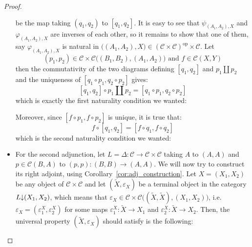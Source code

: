 \begin{proof}
\begin{itemize}
be the map taking $(q_1,q_2)$ to $[q_1,q_2]$. It is easy to see that $\psi_{(A_1,A_2),X}$ and $\varphi_{(A_1,A_2),X}$ are inverses of each other, so it remains to show that one of them, say $\varphi_{(A_1,A_2),X}$ is natural in $\big((A_1,A_2),X\big)\in(\mathcal{C}\times\mathcal{C})^{\mathrm{op}}\times\mathcal{C}$. Let
\[(p_1,p_2)\in\mathcal{C}\times\mathcal{C}\big((B_1,B_2),(A_1,A_2)\big)\text{ and }f\in\mathcal{C}(X,Y)\]
then the commutativity of the two diagrams defining $[q_1,q_2]$ and $p_1\amalg p_2$ and the uniqueness of $[q_1\circ p_1,q_2\circ p_2]$ gives:
\[[q_1,q_2]\circ p_1\amalg p_2=[q_1\circ p_1,q_2\circ p_2]\]
which is exactly the first naturality condition we wanted:
\begin{center}
\end{center}
Moreover, since $[f\circ p_1,f\circ p_2]$ is unique, it is true that:
\[f\circ[q_1,q_2]=[f\circ q_1,f\circ q_2]\]
which is the second naturality condition we wanted:
\begin{center}
\end{center}
\item For the second adjunction, let $L=\Delta:\mathcal{C}\to\mathcal{C}\times\mathcal{C}$ taking $A$ to $(A,A)$ and $p\in\mathcal{C}(B,A)$ to $(p,p):(B,B)\to(A,A)$. We will now try to construct its right adjoint, using Corollary~\ref{cor:adj_construction}. Let $X=(X_1,X_2)$ be any object of $\mathcal{C}\times\mathcal{C}$ and let $(\tilde{X},\varepsilon_X)$ be a terminal object in the category $L\mkern-5mu\downarrow\mkern-5mu (X_1,X_2)$, which means that $\varepsilon_X\in\mathcal{C}\times\mathcal{C}\big((\tilde{X},\tilde{X}),(X_1,X_2)\big)$, i.e. $\varepsilon_X=(\varepsilon^X_1,\varepsilon^X_2)$ for some maps $\varepsilon^X_1:\tilde{X}\to X_1$ and $\varepsilon^X_2:\tilde{X}\to X_2$. Then, the universal property $(\tilde{X},\varepsilon_X)$ should satisfy is the following:


\end{itemize}
\end{proof}
